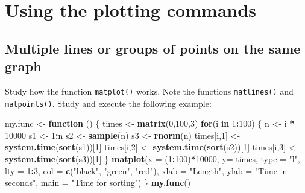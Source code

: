 \documentclass[
]{book}
\newenvironment{Shaded}{\begin{snugshade}}{\end{snugshade}}
\newcommand{\AttributeTok}[1]{\textcolor[rgb]{0.13,0.29,0.53}{#1}}
\newcommand{\ControlFlowTok}[1]{\textcolor[rgb]{0.13,0.29,0.53}{\textbf{#1}}}
\newcommand{\DecValTok}[1]{\textcolor[rgb]{0.00,0.00,0.81}{#1}}
\newcommand{\FunctionTok}[1]{\textcolor[rgb]{0.13,0.29,0.53}{\textbf{#1}}}
\newcommand{\NormalTok}[1]{#1}
\newcommand{\OtherTok}[1]{\textcolor[rgb]{0.56,0.35,0.01}{#1}}
\newcommand{\SpecialCharTok}[1]{\textcolor[rgb]{0.81,0.36,0.00}{\textbf{#1}}}
\newcommand{\StringTok}[1]{\textcolor[rgb]{0.31,0.60,0.02}{#1}}
\begin{document}
\section{Using the plotting commands}\label{using-the-plotting-commands}

\subsection{Multiple lines or groups of points on the same graph}\label{matplot}

Study how the function \texttt{matplot()} works. Note the functions \texttt{matlines()} and \texttt{matpoints()}. Study and execute the following example:

\begin{Shaded}
\begin{Highlighting}[]
\NormalTok{my.func }\OtherTok{\textless{}{-}} \ControlFlowTok{function}\NormalTok{ () }
\NormalTok{\{ times }\OtherTok{\textless{}{-}} \FunctionTok{matrix}\NormalTok{(}\DecValTok{0}\NormalTok{,}\DecValTok{100}\NormalTok{,}\DecValTok{3}\NormalTok{)}
  \ControlFlowTok{for}\NormalTok{(i }\ControlFlowTok{in} \DecValTok{1}\SpecialCharTok{:}\DecValTok{100}\NormalTok{)}
\NormalTok{    \{  n }\OtherTok{\textless{}{-}}\NormalTok{ i }\SpecialCharTok{*} \DecValTok{10000}
\NormalTok{       s1 }\OtherTok{\textless{}{-}} \DecValTok{1}\SpecialCharTok{:}\NormalTok{n}
\NormalTok{       s2 }\OtherTok{\textless{}{-}} \FunctionTok{sample}\NormalTok{(n)}
\NormalTok{       s3 }\OtherTok{\textless{}{-}} \FunctionTok{rnorm}\NormalTok{(n)}
\NormalTok{       times[i,}\DecValTok{1}\NormalTok{] }\OtherTok{\textless{}{-}} \FunctionTok{system.time}\NormalTok{(}\FunctionTok{sort}\NormalTok{(s1))[}\DecValTok{1}\NormalTok{]}
\NormalTok{       times[i,}\DecValTok{2}\NormalTok{] }\OtherTok{\textless{}{-}} \FunctionTok{system.time}\NormalTok{(}\FunctionTok{sort}\NormalTok{(s2))[}\DecValTok{1}\NormalTok{]}
\NormalTok{       times[i,}\DecValTok{3}\NormalTok{] }\OtherTok{\textless{}{-}} \FunctionTok{system.time}\NormalTok{(}\FunctionTok{sort}\NormalTok{(s3))[}\DecValTok{1}\NormalTok{]}
\NormalTok{     \}}
  \FunctionTok{matplot}\NormalTok{(}\AttributeTok{x =}\NormalTok{ (}\DecValTok{1}\SpecialCharTok{:}\DecValTok{100}\NormalTok{)}\SpecialCharTok{*}\DecValTok{10000}\NormalTok{, }\AttributeTok{y=}\NormalTok{ times, }\AttributeTok{type =} \StringTok{"l"}\NormalTok{, }\AttributeTok{lty =} \DecValTok{1}\SpecialCharTok{:}\DecValTok{3}\NormalTok{,}
          \AttributeTok{col =} \FunctionTok{c}\NormalTok{(}\StringTok{"black"}\NormalTok{, }\StringTok{"green"}\NormalTok{, }\StringTok{"red"}\NormalTok{), }\AttributeTok{xlab =} \StringTok{"Length"}\NormalTok{,  }
          \AttributeTok{ylab =} \StringTok{"Time in seconds"}\NormalTok{, }\AttributeTok{main =} \StringTok{"Time for sorting"}\NormalTok{)  }
\NormalTok{\}}
\FunctionTok{my.func}\NormalTok{()}
\end{Highlighting}
\end{Shaded}
\end{document}
